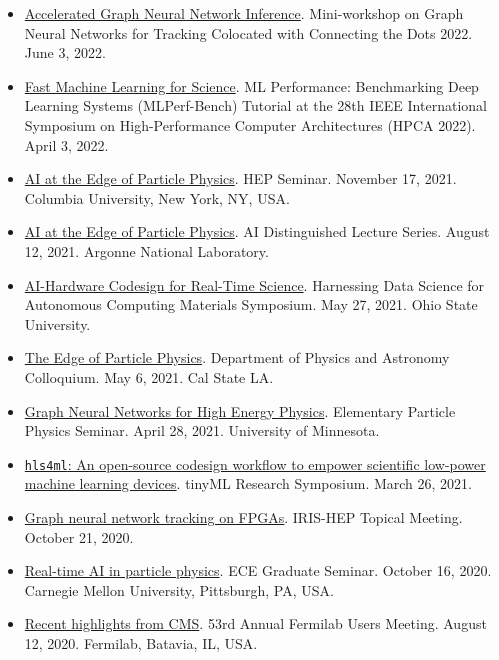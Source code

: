 \documentclass[11pt]{res}
\begin{document}
\begin{resume}
\begin{itemize}
    \item \href{https://indico.cern.ch/event/1128328/contributions/4900731/}{Accelerated Graph Neural Network Inference}. Mini-workshop on Graph Neural Networks for Tracking Colocated with Connecting the Dots 2022. June 3, 2022.
    \item \href{https://sites.google.com/g.harvard.edu/mlperf-bench-hpca22/home}{Fast Machine Learning for Science}. ML Performance: Benchmarking Deep Learning Systems (MLPerf-Bench) Tutorial at the 28th IEEE International Symposium on High-Performance Computer Architectures (HPCA 2022). April 3, 2022.
    \item \href{https://physics.columbia.edu/events/hep-seminar-dr-javier-duarte-ucsd}{AI at the Edge of Particle Physics}. HEP Seminar. November 17, 2021. Columbia University, New York, NY, USA.
    \item \href{https://www.anl.gov/event/ai-at-the-edge-of-particle-physics}{AI at the Edge of Particle Physics}. AI Distinguished Lecture Series. August 12, 2021. Argonne National Laboratory.
    \item \href{https://tdai.osu.edu/events/acm-symposium-harnessing-data-science-autonomous-computing-materials}{AI-Hardware Codesign for Real-Time Science}. Harnessing Data Science for Autonomous Computing Materials Symposium. May 27, 2021. Ohio State University.
    \item \href{https://www.calstatela.edu/dept/physics/colloquia-and-events}{The Edge of Particle Physics}. Department of Physics and Astronomy Colloquium. May 6, 2021. Cal State LA.
    \item \href{https://cse.umn.edu/physics/elementary-particle-physics-elem-part-phys-seminar}{Graph Neural Networks for High Energy Physics}. Elementary Particle Physics Seminar. April 28, 2021. University of Minnesota.
    \item \href{https://www.tinyml.org/event/research-symposium-2021/}{\texttt{hls4ml}: An open-source codesign workflow to empower scientific low-power machine learning devices}. tinyML Research Symposium. March 26, 2021.
    \item \href{https://indico.cern.ch/event/955026/}{Graph neural network tracking on FPGAs}. IRIS-HEP Topical Meeting. October 21, 2020.
    \item \href{https://www.cs.cmu.edu/calendar/fri-2020-10-16-1200/ece-graduate-seminar}{Real-time AI in particle physics}. ECE Graduate Seminar. October 16, 2020. Carnegie Mellon University, Pittsburgh, PA, USA.
    \item \href{https://indico.fnal.gov/event/23109/contributions/193292/}{Recent highlights from CMS}. 53rd Annual Fermilab Users Meeting. August 12, 2020. Fermilab, Batavia, IL, USA.

\end{itemize}
\end{resume}
\end{document}
